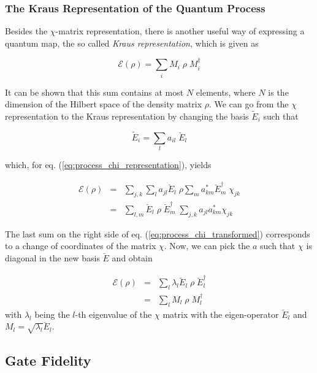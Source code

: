 \subsubsection{The Kraus Representation of the Quantum Process}

Besides the $\chi$-matrix representation, there is another useful way of expressing a quantum map, the so called {\it Kraus representation}, which is given as

\begin{equation}
 \mathcal{E}(\rho) = \sum\limits_i M_i \; \rho \; M_i^\dagger \label{eq:process_kraus_representation}
\end{equation}

It can be shown \citep{haroche_exploring_2006} that this sum contains at most $N$ elements, where $N$ is the dimension of the Hilbert space of the density matrix $\rho$. We can go from the $\chi$ representation to the Kraus representation by changing the basis $\tilde{E}_i$ such that

\begin{equation}
	\tilde{E}_i = \sum\limits_l a_{il}\; \breve{E}_l
\end{equation}

which, for eq. (\ref{eq:process_chi_representation}), yields

\begin{eqnarray}
 \mathcal{E}(\rho) & = & \sum\limits_{j,k} \sum\limits_l a_{jl} \breve{E}_l \; \rho \sum\limits_m a_{km}^* \breve{E}_m^\dagger \; \chi_{jk} \\
 & = & \sum\limits_{l,m}  \breve{E}_l \; \rho \; \breve{E}_m^\dagger \; \sum\limits_{j,k} a_{jl} a_{km}^* \chi_{jk} \label{eq:process_chi_transformed}
\end{eqnarray}

The last sum on the right side of eq. (\ref{eq:process_chi_transformed}) corresponds to a change of coordinates of the matrix $\chi$. Now, we can pick the $a$ such that $\chi$ is diagonal in the new basis $\breve{E}$ and obtain

\begin{eqnarray}
 \mathcal{E}(\rho) & = &  \sum\limits_{l} \lambda_l \breve{E}_l \; \rho \; \breve{E}_l^\dagger \\
& = &  \sum\limits_{l} M_l \; \rho \; M_l^\dagger
\end{eqnarray}
with $\lambda_l$ being the $l$-th eigenvalue of the $\chi$ matrix with the eigen-operator $\breve{E}_l$ and $M_{l} = \sqrt{\lambda_l} \breve{E}_l$.

\subsection{Gate Fidelity}

